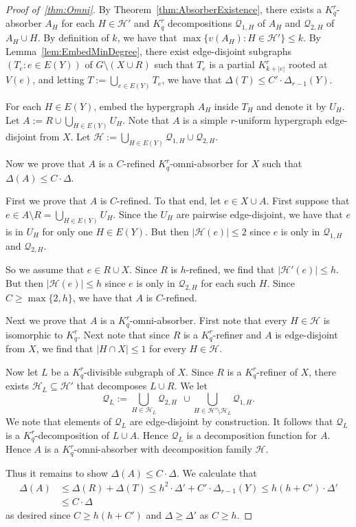 \documentclass[11pt]{article}
\newcounter{i}
\theoremstyle{plain}
\renewcommand{\theclaim}{\thetheorem.\arabic{claim}}
\newenvironment{lateproof}[1]
 {%
  \renewcommand{\theclaim}{\ref{#1}.\arabic{claim}}%
  \begin{proof}[Proof of~\cref{#1}]%
 }
 {\end{proof}}
\theoremstyle{plain} %
\theoremstyle{definition}
\begin{document}
\begin{lateproof}{thm:Omni}
By Theorem~\ref{thm:AbsorberExistence}, there exists a $K_q^r$-absorber $A_H$ for each $H\in \mathcal{H}'$ and $K_q^r$ decompositions $\mathcal{Q}_{1,H}$ of $A_H$ and $\mathcal{Q}_{2,H}$ of $A_H\cup H$. By definition of $k$, we have that $\max\{ v(A_H): H\in \mathcal{H}'\} \le k$. By Lemma~\ref{lem:EmbedMinDegree}, there exist edge-disjoint subgraphs $(T_e: e\in E(Y))$ of $G\setminus (X\cup R)$ such that $T_e$ is a partial $K_{k+|e|}^r$ rooted at $V(e)$, and letting $T:= \bigcup_{e\in E(Y)} T_e$, we have that $\Delta(T) \le C'\cdot \Delta_{r-1}(Y)$.

For each $H\in E(Y)$, embed the hypergraph $A_H$ inside $T_H$ and denote it by $U_H$. Let $A:= R\cup \bigcup_{H\in E(Y)} U_H$. Note that $A$ is a simple $r$-uniform hypergraph edge-disjoint from $X$. Let $\mathcal{H} := \bigcup_{H\in E(Y)} \mathcal{Q}_{1,H}\cup \mathcal{Q}_{2,H}$.

Now we prove that $A$ is a $C$-refined $K_q^r$-omni-absorber for $X$ such that $\Delta(A)\le C\cdot \Delta$.

First we prove that $A$ is $C$-refined. To that end,  let $e\in X\cup A$. First suppose that $e\in A\setminus R = \bigcup_{H\in E(Y)} U_H$. Since the $U_H$ are pairwise edge-disjoint, we have that $e$ is in $U_H$ for only one $H\in E(Y)$. But then $|\mathcal{H}(e)|\le 2$ since $e$ is only in $\mathcal{Q}_{1,H}$ and $\mathcal{Q}_{2,H}$.

So we assume that $e\in R\cup X$. Since $R$ is $h$-refined, we find that $|\mathcal{H}'(e)|\le h$. But then $|\mathcal{H}(e)|\le h$ since $e$ is only in $\mathcal{Q}_{2,H}$ for each such $H$. Since $C\ge \max\{2,h\}$, we have that $A$ is $C$-refined.

Next we prove that $A$ is a $K_q^r$-omni-absorber. First note that every $H\in \mathcal{H}$ is isomorphic to $K_q^r$. Next note that since $R$ is a $K_q^r$-refiner and $A$ is edge-disjoint from $X$, we find that $|H\cap X| \le 1$ for every $H\in \mathcal{H}$.

Now let $L$ be a $K_q^r$-divisible subgraph of $X$. Since $R$ is a $K_q^r$-refiner of $X$, there exists $\mathcal{H}_L \subseteq \mathcal{H}'$ that decomposes $L\cup R$.
We let
$$\mathcal{Q}_L:= \bigcup_{H\in \mathcal{H}_L} \mathcal{Q}_{2,H}~~\cup \bigcup_{H\in \mathcal{H'}\setminus \mathcal{H}_L} \mathcal{Q}_{1,H}.$$
We note that elements of $\mathcal{Q}_L$ are edge-disjoint by construction. It follows that $\mathcal{Q}_L$ is a $K_q^r$-decomposition of $L\cup A$. Hence $\mathcal{Q}_L$ is a decomposition function for $A$. Hence $A$ is a $K_q^r$-omni-absorber with decomposition family $\mathcal{H}$.


Thus it remains to show $\Delta(A)\le C\cdot \Delta$. We calculate that 
\begin{align*}
\Delta(A) &\le \Delta(R)+\Delta(T) \le h^2 \cdot \Delta'+C'\cdot \Delta_{r-1}(Y) \le h(h+C') \cdot \Delta' \\
&\le C\cdot \Delta    
\end{align*}
as desired since $C\ge h(h+C')$ and $\Delta\ge \Delta'$ as $C\ge h$.
\end{lateproof}
\end{document}

